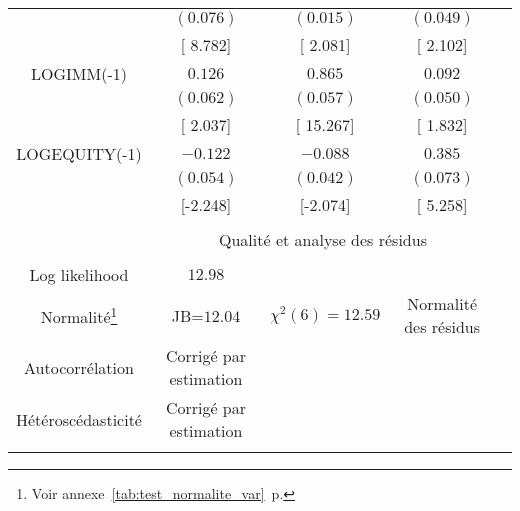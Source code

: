 \begin{tabular}{lrrrr}
\multicolumn{1}{c}{}&\multicolumn{1}{c}{$(0.076)$}&\multicolumn{1}{c}{$(0.015)$}&\multicolumn{1}{c}{$(0.049)$}&\multicolumn{1}{c}{}\\
\multicolumn{1}{c}{}&\multicolumn{1}{c}{[ 8.782]}&\multicolumn{1}{c}{[ 2.081]}&\multicolumn{1}{c}{[ 2.102]}&\multicolumn{1}{c}{}\\
\multicolumn{1}{c}{LOGIMM(-1)}&\multicolumn{1}{c}{$0.126$}&\multicolumn{1}{c}{$0.865$}&\multicolumn{1}{c}{$0.092$}&\multicolumn{1}{c}{}\\
\multicolumn{1}{c}{}&\multicolumn{1}{c}{$(0.062)$}&\multicolumn{1}{c}{$(0.057)$}&\multicolumn{1}{c}{$(0.050)$}&\multicolumn{1}{c}{}\\
\multicolumn{1}{c}{}&\multicolumn{1}{c}{[ 2.037]}&\multicolumn{1}{c}{[ 15.267]}&\multicolumn{1}{c}{[ 1.832]}&\multicolumn{1}{c}{}\\
\multicolumn{1}{c}{LOGEQUITY(-1)}&\multicolumn{1}{c}{$-0.122$}&\multicolumn{1}{c}{$-0.088$}&\multicolumn{1}{c}{$0.385$}&\multicolumn{1}{c}{}\\
\multicolumn{1}{c}{}&\multicolumn{1}{c}{$(0.054)$}&\multicolumn{1}{c}{$(0.042)$}&\multicolumn{1}{c}{$(0.073)$}&\multicolumn{1}{c}{}\\
\multicolumn{1}{c}{}&\multicolumn{1}{c}{[-2.248]}&\multicolumn{1}{c}{[-2.074]}&\multicolumn{1}{c}{[ 5.258]}&\multicolumn{1}{c}{}\\
[2.5pt] \bottomrule \\ [-2.5pt]
\multicolumn{1}{c}{}&\multicolumn{3}{c}{Qualité et analyse des résidus}&\multicolumn{1}{c}{}\\
[2.5pt] \hline \\ [-2.5pt]
\multicolumn{1}{c}{Log likelihood}&\multicolumn{1}{c}{$12.98$}&\multicolumn{1}{c}{}&\multicolumn{1}{c}{}&\multicolumn{1}{c}{}\\
\multicolumn{1}{c}{Normalité\footnote{Voir annexe~\autoref{tab:test_normalite_var}~p.\pageref{tab:test_normalite_var}}}&\multicolumn{1}{c}{JB=$12.04$}&\multicolumn{1}{c}{$\chi^2(6) =12.59$}&\multicolumn{1}{c}{Normalité des résidus}&\multicolumn{1}{c}{}\\
\multicolumn{1}{c}{Autocorrélation}&\multicolumn{1}{c}{Corrigé par estimation}&\multicolumn{1}{c}{}&\multicolumn{1}{c}{}&\multicolumn{1}{c}{}\\
\multicolumn{1}{c}{Hétéroscédasticité}&\multicolumn{1}{c}{Corrigé par estimation}&\multicolumn{1}{c}{}&\multicolumn{1}{c}{}&\multicolumn{1}{c}{}\\
[2.5pt] \bottomrule \\ [-2.5pt]
\end{tabular}
